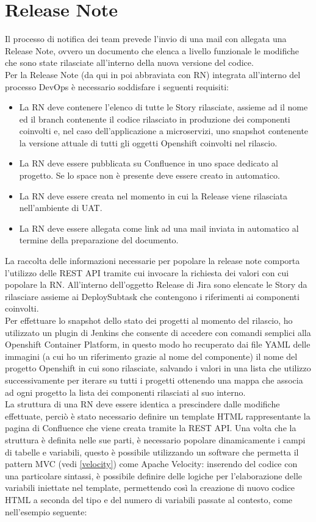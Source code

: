 \documentclass[a4paper, 12pt]{report}
\numberwithin{equation}{section}
\begin{document}
\section{Release Note}
Il processo di notifica dei team prevede l'invio di una mail con allegata una Release Note, ovvero un documento che elenca a livello funzionale le modifiche che sono state rilasciate all'interno della nuova versione del codice.\\
Per la Release Note (da qui in poi abbraviata con RN) integrata all'interno del processo DevOps è necessario soddisfare i seguenti requisiti:
\begin{itemize}
    \item La RN deve contenere l'elenco di tutte le Story rilasciate, assieme ad il nome ed il branch contenente il codice rilasciato in produzione dei componenti coinvolti e, nel caso dell'applicazione a microservizi, uno snapshot contenente la versione attuale di tutti gli oggetti Openshift coinvolti nel rilascio.
    \item La RN deve essere pubblicata su Confluence in uno space dedicato al progetto. Se lo space non è presente deve essere creato in automatico.
    \item La RN deve essere creata nel momento in cui la Release viene rilasciata nell'ambiente di UAT.
    \item La RN deve essere allegata come link ad una mail inviata in automatico al termine della preparazione del documento.
\end{itemize}
La raccolta delle informazioni necessarie per popolare la release note comporta l'utilizzo delle REST API tramite cui invocare la richiesta dei valori con cui popolare la RN. All'interno dell'oggetto Release di Jira sono elencate le Story da rilasciare assieme ai DeploySubtask che contengono i riferimenti ai componenti coinvolti.\\
Per effettuare lo snapshot dello stato dei progetti al momento del rilascio, ho utilizzato un plugin di Jenkins che consente di accedere con comandi semplici alla Openshift Container Platform, in questo modo ho recuperato dai file YAML delle immagini (a cui ho un riferimento grazie al nome del componente) il nome del progetto Openshift in cui sono rilasciate, salvando i valori in una lista che utilizzo successivamente per iterare su tutti i progetti ottenendo una mappa che associa ad ogni progetto la lista dei componenti rilasciati al suo interno.\\
La struttura di una RN deve essere identica a prescindere dalle modifiche effettuate, perciò è stato necessario definire un template HTML rappresentante la pagina di Confluence che viene creata tramite la REST API. Una volta che la struttura è definita nelle sue parti, è necessario popolare dinamicamente i campi di tabelle e variabili, questo è possibile utilizzando un software che permetta il pattern  MVC (vedi \ref{velocity}) come Apache Velocity: inserendo del codice con una particolare sintassi, è possibile definire delle logiche per l'elaborazione delle variabili iniettate nel template, permettendo così la creazione di nuovo codice HTML a seconda del tipo e del numero di variabili passate al contesto, come nell'esempio seguente:
\end{document}
